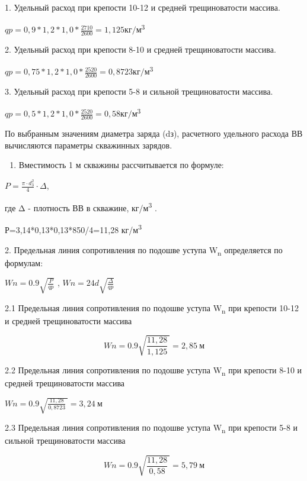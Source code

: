   \begin{multicols}{2}

1. Удельный расход при крепости 10-12 и средней трещиноватости массива.

\(qp = 0,9*1,2*1,0*\frac{2710}{2600} = 1,125кг/м\)\textsuperscript{3}

2. Удельный расход при крепости 8-10 и средней трещиноватости массива.

\(qp = 0,75*1,2*1,0*\frac{2520}{2600} = 0,8723кг/м\)\textsuperscript{3}

3. Удельный расход при крепости 5-8 и сильной трещиноватости массива.

\(qp = 0,5*1,2*1,0*\frac{2520}{2600} = 0,58кг/м\)\textsuperscript{3}

По выбранным значениям диаметра заряда (dз), расчетного удельного
расхода ВВ вычисляются параметры скважинных зарядов.

\begin{enumerate}
\def\labelenumi{\arabic{enumi}.}
\item
  Вместимость 1 м скважины рассчитывается по формуле:
\end{enumerate}

$P = \frac{\pi \cdot d_3^2}{4} \cdot \Delta$, 

где Δ - плотность ВВ в скважине, кг/м\textsuperscript{3} .

Р=3,14*0,13*0,13*850/4=11,28 кг/м\textsuperscript{3}

2. Предельная линия сопротивления по подошве уступа W\textsubscript{n}
определяется по формулам:

\(Wn = 0.9\sqrt{\frac{P}{qp}}\) , \(Wn = 24d\sqrt{\frac{\Delta}{qp}}\)

2.1 Предельная линия сопротивления по подошве уступа W\textsubscript{n}
при крепости 10-12 и средней трещиноватости массива

\[Wn = 0.9\sqrt{\frac{11,28}{1,125}\ } = 2,85\ м\]

2.2 Предельная линия сопротивления по подошве уступа W\textsubscript{n}
при крепости 8-10 и средней трещиноватости массива

\(Wn = 0.9\sqrt{\frac{11,28}{0,8723}\ } = 3,24\ м\)

2.3 Предельная линия сопротивления по подошве уступа W\textsubscript{n}
при крепости 5-8 и сильной трещиноватости массива

\[Wn = 0.9\sqrt{\frac{11,28}{0,58}\ } = 5,79\ м\]
\end{multicols}

